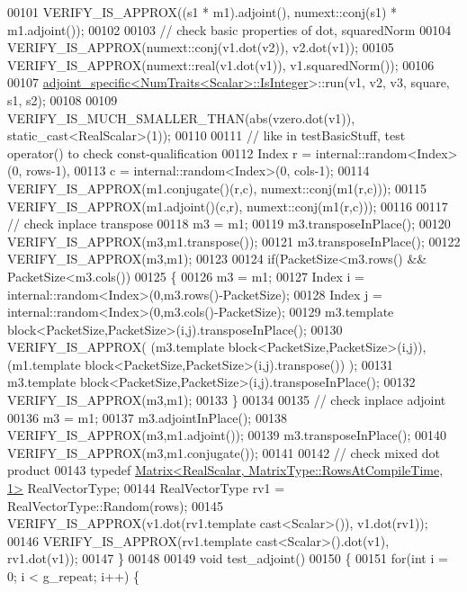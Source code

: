\begin{DoxyCode}
00101   VERIFY\_IS\_APPROX((s1 * m1).adjoint(),                     numext::conj(s1) * m1.adjoint());
00102 
00103   \textcolor{comment}{// check basic properties of dot, squaredNorm}
00104   VERIFY\_IS\_APPROX(numext::conj(v1.dot(v2)),               v2.dot(v1));
00105   VERIFY\_IS\_APPROX(numext::real(v1.dot(v1)),               v1.squaredNorm());
00106   
00107   \hyperlink{structadjoint__specific}{adjoint\_specific<NumTraits<Scalar>::IsInteger}>::run(v1, v2, 
      v3, square, s1, s2);
00108   
00109   VERIFY\_IS\_MUCH\_SMALLER\_THAN(abs(vzero.dot(v1)),  static\_cast<RealScalar>(1));
00110   
00111   \textcolor{comment}{// like in testBasicStuff, test operator() to check const-qualification}
00112   Index r = internal::random<Index>(0, rows-1),
00113       c = internal::random<Index>(0, cols-1);
00114   VERIFY\_IS\_APPROX(m1.conjugate()(r,c), numext::conj(m1(r,c)));
00115   VERIFY\_IS\_APPROX(m1.adjoint()(c,r), numext::conj(m1(r,c)));
00116 
00117   \textcolor{comment}{// check inplace transpose}
00118   m3 = m1;
00119   m3.transposeInPlace();
00120   VERIFY\_IS\_APPROX(m3,m1.transpose());
00121   m3.transposeInPlace();
00122   VERIFY\_IS\_APPROX(m3,m1);
00123   
00124   \textcolor{keywordflow}{if}(PacketSize<m3.rows() && PacketSize<m3.cols())
00125   \{
00126     m3 = m1;
00127     Index i = internal::random<Index>(0,m3.rows()-PacketSize);
00128     Index j = internal::random<Index>(0,m3.cols()-PacketSize);
00129     m3.template block<PacketSize,PacketSize>(i,j).transposeInPlace();
00130     VERIFY\_IS\_APPROX( (m3.template block<PacketSize,PacketSize>(i,j)), (m1.template 
      block<PacketSize,PacketSize>(i,j).transpose()) );
00131     m3.template block<PacketSize,PacketSize>(i,j).transposeInPlace();
00132     VERIFY\_IS\_APPROX(m3,m1);
00133   \}
00134 
00135   \textcolor{comment}{// check inplace adjoint}
00136   m3 = m1;
00137   m3.adjointInPlace();
00138   VERIFY\_IS\_APPROX(m3,m1.adjoint());
00139   m3.transposeInPlace();
00140   VERIFY\_IS\_APPROX(m3,m1.conjugate());
00141 
00142   \textcolor{comment}{// check mixed dot product}
00143   \textcolor{keyword}{typedef} \hyperlink{group___core___module_class_eigen_1_1_matrix}{Matrix<RealScalar, MatrixType::RowsAtCompileTime, 1>}
       RealVectorType;
00144   RealVectorType rv1 = RealVectorType::Random(rows);
00145   VERIFY\_IS\_APPROX(v1.dot(rv1.template cast<Scalar>()), v1.dot(rv1));
00146   VERIFY\_IS\_APPROX(rv1.template cast<Scalar>().dot(v1), rv1.dot(v1));
00147 \}
00148 
00149 \textcolor{keywordtype}{void} test\_adjoint()
00150 \{
00151   \textcolor{keywordflow}{for}(\textcolor{keywordtype}{int} i = 0; i < g\_repeat; i++) \{

\end{DoxyCode}
